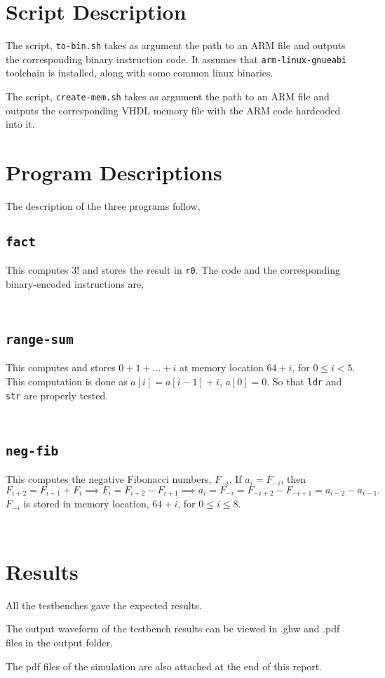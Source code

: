 \documentclass[a4paper]{scrartcl}
\renewcommand{\tt}{\texttt}
\newcommand{\reg}{\texttt}
\newcommand{\addwaveformpdf}[1]{
	
}
\newcommand{\addprogramcode}[1]{%
\begin{minipage}{.25\textwidth}%
    \inputminted[linenos]{text}{../code/arm/binary/#1.txt}%
\end{minipage}%
\begin{minipage}{.7\textwidth}%
    \inputminted{arm}{../code/arm/assembly/#1.s}%
\end{minipage}%
}
\begin{document}
\section{Script Description}
The script, \tt{to-bin.sh} takes as argument the path to an ARM file and outputs the corresponding binary instruction code. It assumes that \tt{arm-linux-gnueabi} toolchain is installed, along with some common linux binaries.

The script, \tt{create-mem.sh} takes as argument the path to an ARM file and outputs the corresponding VHDL memory file with the ARM code hardcoded into it.

\section{Program Descriptions}
The description of the three programs follow,

\subsection{\texttt{fact}}

This computes $3!$ and stores the result in \reg{r0}. The code and the corresponding binary-encoded instructions are,

\addprogramcode{fact}
\clearpage

\subsection{\texttt{range-sum}}
This computes and stores $0 + 1 + \dots + i$ at memory location $64 + i$, for $0 \le i < 5$. This computation is done as $a[i] = a[i - 1] + i$, $a[0] = 0$. So that \reg{ldr} and \reg{str} are properly tested.

\addprogramcode{range-sum}
\clearpage

\subsection{\texttt{neg-fib}}
This computes the negative Fibonacci numbers, $F_{-i}$. If $a_i = F_{-i}$, then
\[F_{i + 2} = F_{i + 1} + F_{i} \implies F_i = F_{i + 2} - F_{i + 1} \implies a_i = F_{-i} = F_{-i + 2} - F_{-i + 1} = a_{i - 2} - a_{i - 1}.\]
$F_{-i}$ is stored in memory location, $64 + i$, for $0 \le i \le 8$.

\addprogramcode{neg-fib}
\clearpage

\section{Results}
All the testbenches gave the expected results.

The output waveform of the testbench results can be viewed in .ghw and .pdf files in the output folder.

The pdf files of the simulation are also attached at the end of this report.

\addwaveformpdf{arm-tests/fact}
\addwaveformpdf{arm-tests/range-sum}
\addwaveformpdf{arm-tests/neg-fib}
\end{document}
